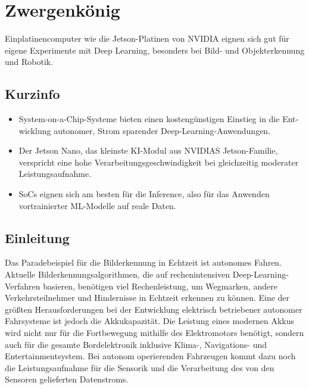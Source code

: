 %
%


\chapter{Zwergenkönig}

Einplatinencomputer wie die Jetson-Platinen von NVIDIA eignen sich gut für eigene Experimente mit Deep Learning, besonders bei Bild- und Objekterkennung und Robotik. 

\section{Kurzinfo}

\begin{itemize}
  \item System-on-a-Chip-Systeme bieten einen kostengünstigen Einstieg in die Ent­wicklung autonomer, Strom sparender Deep-Learning-Anwendungen. 
  \item Der Jetson Nano, das kleinste KI-Modul aus NVIDIAS Jetson-Familie, verspricht eine hohe Verarbeitungsgeschwindigkeit bei gleichzeitig moderater Leistungs­aufnahme. 
  \item SoCs eignen sich am besten für die Inference, also für das Anwenden vortrainierter ML-Modelle auf reale Daten. 
\end{itemize}


\section{Einleitung}

Das Paradebeispiel für die Bilderkennung in Echtzeit ist autonomes Fahren. Aktuelle Bilderkennungsalgorithmen, die auf rechenintensiven Deep-­Learning-Verfahren basieren, be­nötigen viel Rechenleistung, um Wegmarken, andere Verkehrsteilnehmer und Hindernisse in Echtzeit erkennen zu können. Eine der größten Herausforderungen bei der Entwicklung elektrisch betriebener autonomer Fahrsysteme ist jedoch die Akkukapazität. Die Leistung eines modernen Akkus wird nicht nur für die Fortbewegung mithilfe des Elektromotors benötigt, sondern auch für die gesamte Bordelek­tronik inklusive Klima-, Navigations- und Entertainmentsystem. Bei autonom operierenden Fahrzeugen kommt dazu noch die Leistungsaufnahme für die Sensorik und die Verarbeitung des von den Sensoren gelieferten Datenstroms. 

